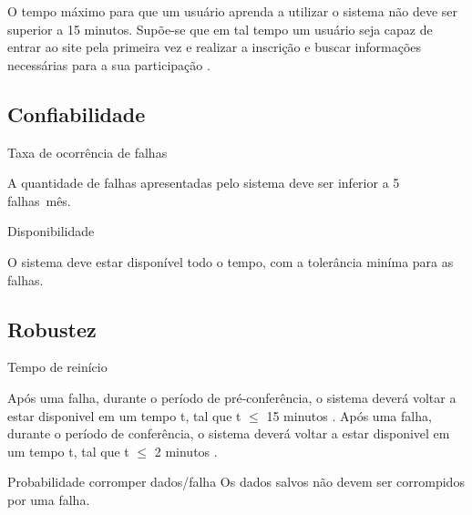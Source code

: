 \documentclass[letter]{article}
\begin{document}
O tempo máximo para que um usuário aprenda a utilizar o sistema não deve ser superior a 15 minutos.
Supõe-se que em tal tempo um usuário seja capaz de entrar ao site 
pela primeira vez e realizar a inscrição e buscar informações necessárias para a sua participação .


\subsection{Confiabilidade}
\textbullet\hspace{1mm} Taxa de ocorrência de falhas

A quantidade de falhas apresentadas pelo sistema deve ser inferior a 5 falhas\ mês.

\textbullet\hspace{1mm} Disponibilidade

O sistema deve estar disponível todo o tempo, com a tolerância miníma para as falhas.


\subsection{Robustez}
\textbullet\hspace{1mm} Tempo de reinício

Após uma falha, durante o período de pré-conferência, o sistema deverá voltar a estar disponivel em um tempo t, tal que t $\leq$ 15 minutos .
Após uma falha, durante o período de conferência, o sistema deverá voltar a estar disponivel em um tempo t, tal que t $\leq$ 2 minutos .

\textbullet\hspace{1mm} Probabilidade corromper dados/falha
Os dados salvos não devem ser corrompidos por uma falha.
\end{document}
